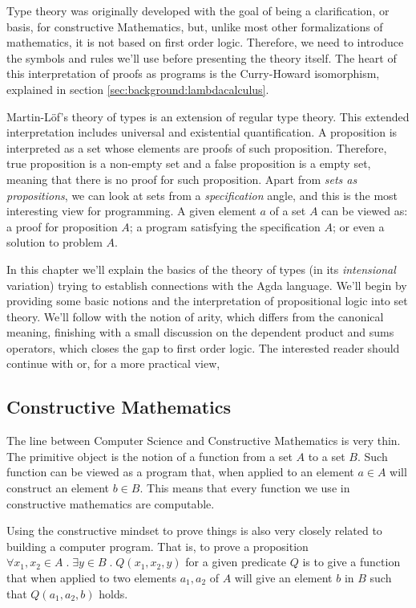 Type theory was originally developed with the goal of being a clarification, or basis,
for constructive Mathematics, but, unlike most other formalizations of mathematics, it is
not based on first order logic. Therefore, we need to introduce the symbols and
rules we'll use before presenting the theory itself. The heart of this interpretation of
proofs as programs is the Curry-Howard isomorphism, explained in section \ref{sec:background:lambdacalculus}.

Martin-L\"{o}f's theory of types \cite{lof84} is an extension of regular type theory. This extended
interpretation includes universal and existential quantification. 
A proposition is interpreted as a set whose elements
are proofs of such proposition. Therefore, true proposition is a non-empty set and a false proposition
is a empty set, meaning that there is no proof for such proposition. Apart from \emph{sets as propositions},
we can look at sets from a \emph{specification} angle, and this is the most interesting view for programming.
A given element $a$ of a set $A$ can be viewed as: a proof for proposition $A$; a program satisfying the
specification $A$; or even a solution to problem $A$.

In this chapter we'll explain the basics of the theory of types (in its \emph{intensional} variation)
trying to establish connections with the Agda language. We'll begin by providing some basic notions
and the interpretation of propositional logic into set theory. We'll follow with the notion of arity,
which differs from the canonical meaning, finishing with a small discussion on the dependent product
and sums operators, which closes the gap to first order logic. The interested reader should continue
with \cite{nords90} or, for a more practical view, \cite{wouter08,bove2009}

\subsection{Constructive Mathematics}
\label{subsec:martinlof:constructivemathematics}

The line between Computer Science and Constructive Mathematics is very thin. The primitive object is
the notion of a function from a set $A$ to a set $B$. Such function can be viewed as a program that,
when applied to an element $a \in A$ will construct an element $b \in B$. This means that every
function we use in constructive mathematics are computable. 

Using the constructive mindset to prove things is also very closely related to building a computer program.
That is, to prove a proposition $\forall x_1,x_2 \in A \; . \; \exists y \in B \; . \; Q(x_1, x_2, y)$ for a given
predicate $Q$ is to give a function that when applied to two elements $a_1, a_2$ of $A$ will give an element $b$ in $B$
such that $Q(a_1, a_2, b)$ holds. 

